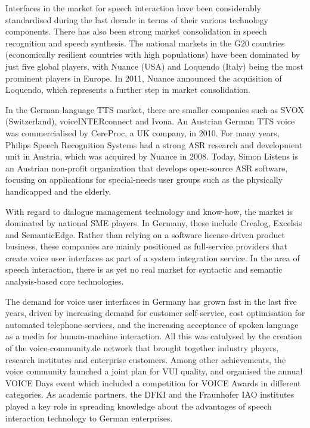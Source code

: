 \documentclass[]{../../metanetpaper}
\begin{document}
\begin{Parallel}[c]{80mm}{80mm}
{    Interfaces in the market for speech interaction have been considerably standardised during the last decade in terms of their various technology components. There has also been strong market consolidation in speech recognition and speech synthesis. The national markets in the G20 countries (economically resilient countries with high populations) have been dominated by just five global players, with Nuance (USA) and Loquendo (Italy) being the most prominent players in Europe. In 2011, Nuance announced the acquisition of Loquendo, which represents a further step in market consolidation.

    In the German-language TTS market, there are smaller companies such as SVOX (Switzerland), voiceINTERconnect and Ivona. An Austrian German TTS voice was commercialised by CereProc, a UK company, in 2010. For many years, Philips Speech Recognition Systems had a strong ASR research and development unit in Austria, which was acquired by Nuance in 2008. Today, Simon Listens is an Austrian non-profit organization that develops open-source ASR software, focusing on applications for special-needs user groups such as the physically handicapped and the elderly.

    With regard to dialogue management technology and know-how, the market is dominated by national SME players. In Germany, these include Crealog, Excelsis and SemanticEdge. Rather than relying on a software license-driven product business, these companies are mainly positioned as full-service providers that create voice user interfaces as part of a system integration service. In the area of speech interaction, there is as yet no real market for syntactic and semantic analysis-based core technologies.

    The demand for voice user interfaces in Germany has grown fast in the last five years, driven by increasing demand for customer self-service, cost optimisation for automated telephone services, and the increasing acceptance of spoken language as a media for human-machine interaction. All this was catalysed by the creation of the voice-community.de network that brought together industry players, research institutes and enterprise customers. Among other achievements, the voice community launched a joint plan for VUI quality, and organised the annual VOICE Days event which included a competition for VOICE Awards in different categories. As academic partners, the DFKI and the Fraunhofer IAO institutes played a key role in spreading knowledge about the advantages of speech interaction technology to German enterprises.

}
\end{Parallel}
\end{document}
